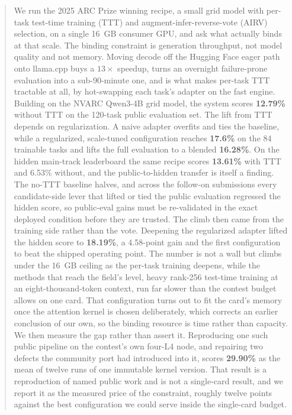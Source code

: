\documentclass[11pt]{article}
\begin{document}
\begin{abstract}
We run the 2025 ARC Prize winning recipe, a small grid model with per-task test-time training (TTT)
and augment-infer-reverse-vote (AIRV) selection, on a single 16~GB consumer GPU, and ask what actually
binds at that scale. The binding constraint is generation throughput, not model quality and not memory.
Moving decode off the Hugging Face eager path onto llama.cpp buys a $13\times$ speedup, turns an
overnight failure-prone evaluation into a sub-90-minute one, and is what makes per-task TTT tractable
at all, by hot-swapping each task's adapter on the fast engine. Building on the NVARC Qwen3-4B grid
model, the system scores \textbf{12.79\%} without TTT on the 120-task public evaluation set. The lift
from TTT depends on regularization. A naive adapter overfits and ties the baseline, while a
regularized, scale-tuned configuration reaches \textbf{17.6\%} on the 84 trainable tasks and lifts the
full evaluation to a blended \textbf{16.28\%}. On the hidden main-track leaderboard the same recipe
scores \textbf{13.61\%} with TTT and 6.53\% without, and the public-to-hidden transfer is itself a
finding. The no-TTT baseline halves, and across the follow-on submissions every candidate-side lever
that lifted or tied the public evaluation regressed the hidden score, so public-eval gains must be
re-validated in the exact deployed condition before they are trusted. The climb then came from the training side rather than the vote. Deepening the
regularized adapter lifted the hidden score to \textbf{18.19\%}, a 4.58-point gain and the first
configuration to beat the shipped operating point. The number is not a wall but climbs under the 16~GB
ceiling as the per-task training deepens, while the methods that reach the field's level, heavy rank-256
test-time training at an eight-thousand-token context, run far slower than the contest budget allows on one
card. That configuration turns out to fit the card's memory once the attention kernel is chosen
deliberately, which corrects an earlier conclusion of our own, so the binding resource is time rather than
capacity. We then measure the gap rather than assert it. Reproducing one such public pipeline on the
contest's own four-L4 node, and repairing two defects the community port had introduced into it, scores
\textbf{29.90\%} as the mean of twelve runs of one immutable kernel version. That result is a
reproduction of named public work and is not a single-card result, and we report it as the measured
price of the constraint, roughly twelve points against the best configuration we could serve inside
the single-card budget.


\end{abstract}
\end{document}
